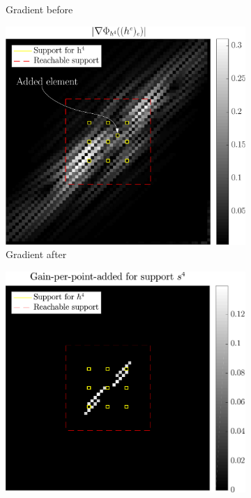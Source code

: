 \begin{figure}[!h]
\begin{subfigure}[b]{0.32\linewidth}
\caption{Gradient before}\label{fig_beforeafter-grad_before}
\end{subfigure}
\begin{subfigure}[b]{0.32\linewidth}\centering
\includegraphics[width=\linewidth]{figures/before_after/xp_128x128_sc2_angl1_K3_S3_node4after_partgrad4.pdf}
\caption{Gradient after}\label{fig_beforeafter-grad_after}
\end{subfigure}
\begin{subfigure}[b]{0.32\linewidth}\centering
\includegraphics[width=\linewidth]{figures/before_after/xp_128x128_sc2_angl1_K3_S3_node4before_objmatrix_bestvalues.pdf}

\end{subfigure}
\end{figure}
